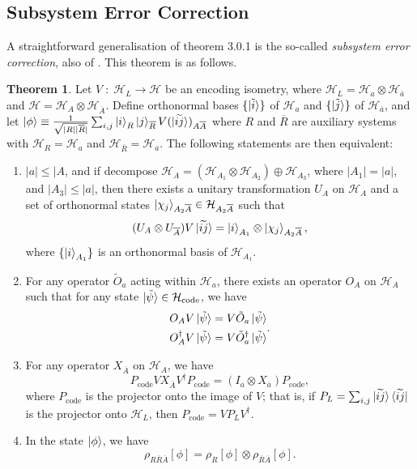 \documentclass[12pt,a4paper]{report}
\numberwithin{equation}{section}
\newcommand{\ketbra}[2]{\ket{#1}\bra{#2}}
\newcommand{\ketbras}[1]{\ketbra{#1}{#1}}
\newcommand{\Pc}{P_{\text{code}}}
\newcommand{\Hcode}{\mathcal{H}_{\text{code}}}
\newcommand{\ol}[1]{\overline{#1}}
\theoremstyle{definition}
\theoremstyle{theorem}
\newtheorem{theorem}{Theorem}[section]
\theoremstyle{theorem}
\theoremstyle{example}
\theoremstyle{definition}
\begin{document}
\subsection{Subsystem Error Correction}
A straightforward generalisation of theorem 3.0.1 is the so-called \textit{subsystem error correction}, also of \cite{Harlow}. This theorem is as follows.
\begin{theorem}
	Let $V\;:\;\mathcal{H}_{L}\to\mathcal{H}$ be an encoding isometry, where $\mathcal{H}_{L}=\mathcal{H}_{a}\otimes\mathcal{H}_{\ol{a}}$ and $\mathcal{H}=\mathcal{H}_{A}\otimes\mathcal{H}_{\ol{A}}$. Define orthonormal bases $\{\ket{\tilde{i}}\}$ of $\mathcal{H}_{a}$ and $\{\ket{\tilde{j}}\}$ of $\mathcal{H}_{\ol{a}}$, and let $\ket{\phi}\equiv\frac{1}{\sqrt{|R||\ol{R}|}}\sum_{i,j}\ket{i}_{R}\ket{j}_{\ol{R}}V(\ket{\widetilde{ij}})_{A\ol{A}}$ where $R$ and $\ol{R}$ are auxiliary systems with $\mathcal{H}_{R}=\mathcal{H}_{a}$ and $\mathcal{H}_{\ol{R}}=\mathcal{H}_{\ol{a}}$. The following statements are then equivalent:
	\begin{enumerate}
		\item $|a|\leq|A$, and if decompose $\mathcal{H}_{A}=(\mathcal{H}_{A_{1}}\otimes\mathcal{H}_{A_{2}})\oplus\mathcal{H}_{A_{3}}$, where $|A_{1}|=|a|$, and $|A_{3}|\leq |a|$, then there exists a unitary transformation $U_{A}$ on $\mathcal{H}_{A}$ and a set of orthonormal states $\ket{\chi_{j}}_{A_{2}\ol{A}}\in\mathcal{H}_{A_{2}\ol{A}}$ such that
		\begin{equation}
			(U_{A}\otimes U_{\ol{A}})V\ket{\widetilde{ij}}=\ket{i}_{A_{1}}\otimes\ket{\chi_{j}}_{A_{2}\ol{A}},
		\end{equation}
		where $\{\ket{i}_{A_{1}}\}$ is an orthonormal basis of $\mathcal{H}_{A_{1}}$.
		\item For any operator $\tilde{O}_{a}$ acting within $\mathcal{H}_{a}$, there exists an operator $O_{A}$ on $\mathcal{H}_{A}$ such that for any state $\ket{\tilde{\psi}}\in\Hcode$, we have
		\begin{equation}
			\begin{aligned}
				O_{A}V\ket{\tilde{\psi}}&=V\tilde{O}_{a}\ket{\tilde{\psi}}\\
				O_{A}^{\dagger}V\ket{\tilde{\psi}}&=V\tilde{O}_{a}^{\dagger}\ket{\tilde{\psi}}
			\end{aligned}.
		\end{equation}
		\item For any operator $X_{\ol{A}}$ on $\mathcal{H}_{A}$, we have
		\begin{equation}
			\Pc VX_{\ol{A}}V^{\dagger}\Pc=(I_{a}\otimes X_{\ol{a}})\Pc,
		\end{equation}
		where $\Pc$ is the projector onto the image of $V$; that is, if $P_{L}=\sum_{i,j}\ketbras{\widetilde{ij}}$ is the projector onto $\mathcal{H}_{L}$, then $\Pc=VP_{L}V^{\dagger}$.
		\item In the state $\ket{\phi}$, we have
		\begin{equation}
			\rho_{R\ol{R}\ol{A}}[\phi]=\rho_{R}[\phi]\otimes\rho_{\ol{R}\ol{A}}[\phi].
		\end{equation}
	\end{enumerate}
\end{theorem}
\end{document}
